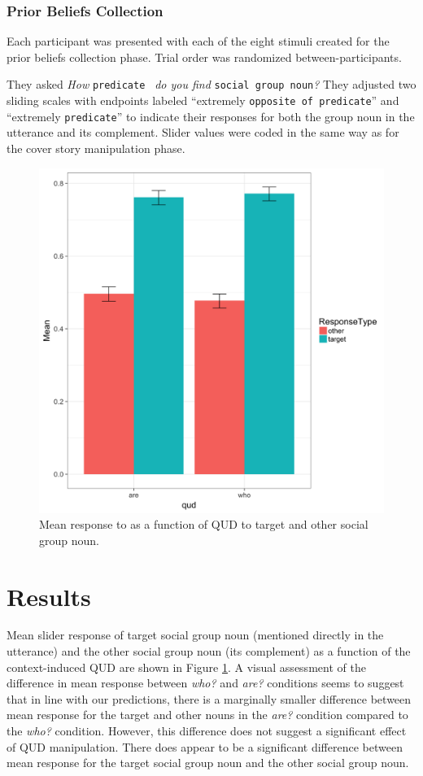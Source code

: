 \documentclass[11pt,a4paper]{article}
\begin{document}
\subsubsection{Prior Beliefs Collection}
Each participant was presented with each of the eight stimuli created for the prior beliefs collection phase. Trial order was randomized between-participants. 

They asked \textit{How }\texttt{predicate } \textit{do you find }\texttt{social group noun}\textit{?} They adjusted two sliding scales with endpoints labeled “extremely \texttt{opposite of predicate}” and “extremely \texttt{predicate}” to indicate their responses for both the group noun in the utterance and its complement. Slider values were coded in the same way as for the cover story manipulation phase.

\begin{figure}[h]
\includegraphics[width=\linewidth]{qud_means.png}
\caption{Mean response to as a function of QUD to target and other social group noun.}
\label{means}
\end{figure}
\section{Results}

Mean slider response of target social group noun (mentioned directly in the utterance) and the other social group noun (its complement) as a function of the context-induced QUD are shown in Figure \ref{means}. A visual assessment of the difference in mean response between \textit{who?} and \textit{are?} conditions seems to suggest that in line with our predictions, there is a marginally smaller difference between mean response for the target and other nouns in the \textit{are?} condition compared to the \textit{who?} condition. However, this difference does not suggest a significant effect of QUD manipulation. There does appear to be a significant difference between mean response for the target social group noun and the other social group noun.
\end{document}
